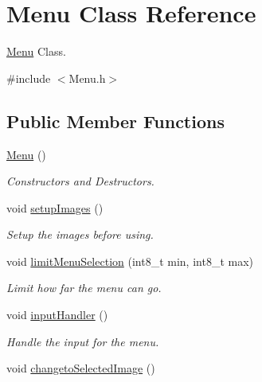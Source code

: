\hypertarget{class_menu}{\section{Menu Class Reference}
\label{class_menu}
}


\hyperlink{class_menu}{Menu} Class.  




{\ttfamily \#include $<$Menu.\+h$>$}

\subsection*{Public Member Functions}
\begin{DoxyCompactItemize}
\item 
\hyperlink{class_menu_ad466dd83355124a6ed958430450bfe94}{Menu} ()
\begin{DoxyCompactList}\small\item\em Constructors and Destructors. \end{DoxyCompactList}\item 
\hypertarget{class_menu_af6db77eb2872203125bffeaf61de4541}{void \hyperlink{class_menu_af6db77eb2872203125bffeaf61de4541}{setup\+Images} ()}\label{class_menu_af6db77eb2872203125bffeaf61de4541}

\begin{DoxyCompactList}\small\item\em Setup the images before using. \end{DoxyCompactList}\item 
\hypertarget{class_menu_aea40f73a185945bb467149fea90cfaed}{void \hyperlink{class_menu_aea40f73a185945bb467149fea90cfaed}{limit\+Menu\+Selection} (int8\+\_\+t min, int8\+\_\+t max)}\label{class_menu_aea40f73a185945bb467149fea90cfaed}

\begin{DoxyCompactList}\small\item\em Limit how far the menu can go. \end{DoxyCompactList}\item 
\hypertarget{class_menu_a426d6165edeb97b62bd24ae222c4c4d9}{void \hyperlink{class_menu_a426d6165edeb97b62bd24ae222c4c4d9}{input\+Handler} ()}\label{class_menu_a426d6165edeb97b62bd24ae222c4c4d9}

\begin{DoxyCompactList}\small\item\em Handle the input for the menu. \end{DoxyCompactList}\item 
\hypertarget{class_menu_a836a47ba69b3fd17d01d1e91368ae5e9}{void \hyperlink{class_menu_a836a47ba69b3fd17d01d1e91368ae5e9}{changeto\+Selected\+Image} ()}\label{class_menu_a836a47ba69b3fd17d01d1e91368ae5e9}


\end{DoxyCompactItemize}
